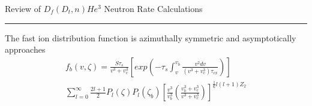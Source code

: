 \documentclass{slides}
\begin{document}
        \boldmath
        \begin{center}Review of $ D_f(D_t,n)He^3 $ Neutron Rate Calculations \end{center}
        \bigskip
	\hrule height2pt
        \bigskip
	The  fast ion distribution function is azimuthally symmetric and
        asymptotically approaches 
          \begin{eqnarray}  %
           f_b(v,\zeta)= \frac{\dot S \tau_s}{v^3+v_c^3}
              \left[exp\left(-\tau_s\int_{v}^{v_b}\frac{v^2dv}
               {(v^3+v_c^3)\tau_{cx}}\right)\right] \nonumber \\
               \sum_{l=0}^{\infty}\frac{2l+1}{2}P_l(\zeta)P_l(\zeta_b)
               \left[\frac{v^3}{v_b^3} \left(\frac{v_b^3+v_c^3}{v^3+v_c^3}
                \right)\right]^{\frac{1}{6}l(l+1)Z_2}
          \end{eqnarray}
\end{document}
